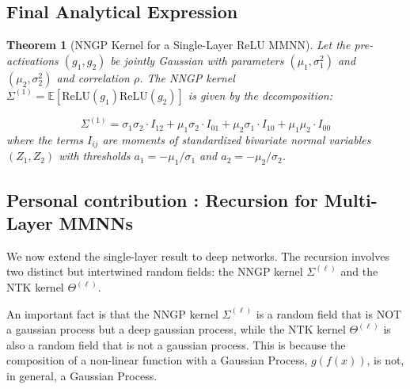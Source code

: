 \documentclass[a4paper]{article}
\theoremstyle{plain}
\newtheorem{theorem}{Theorem}[section]
\theoremstyle{definition}
\theoremstyle{remark}
\begin{document}
\subsection{Final Analytical Expression}
\begin{theorem}[NNGP Kernel for a Single-Layer ReLU MMNN]
Let the pre-activations $(g_1, g_2)$ be jointly Gaussian with parameters $(\mu_1, \sigma_1^2)$ and $(\mu_2, \sigma_2^2)$ and correlation $\rho$. The NNGP kernel $\Sigma^{(1)} = \mathbb{E}[\text{ReLU}(g_1)\text{ReLU}(g_2)]$ is given by the decomposition:

\begin{tcolorbox}[colback=blue!10,colframe=blue!80!black,title={\textbf{NNGP Kernel Decomposition}},enhanced,drop shadow,boxrule=2pt]
\begin{equation}
\label{eq:final_ntk_decomp}
\boxed{
\Sigma^{(1)} = \sigma_1\sigma_2 \cdot I_{12} + \mu_1\sigma_2 \cdot I_{01} + \mu_2\sigma_1 \cdot I_{10} + \mu_1\mu_2 \cdot I_{00}
}
\end{equation}
where the terms $I_{ij}$ are moments of standardized bivariate normal variables $(Z_1, Z_2)$ with thresholds $a_1 = -\mu_1/\sigma_1$ and $a_2 = -\mu_2/\sigma_2$.
\end{tcolorbox}
\end{theorem}















\subsection{Personal contribution : Recursion for Multi-Layer MMNNs}
We now extend the single-layer result to deep networks. The recursion involves two distinct but intertwined random fields: the NNGP kernel $\Sigma^{(\ell)}$ and the NTK kernel $\Theta^{(\ell)}$.

\begin{tcolorbox}[colback=red!10,colframe=red!80!black,title={\textbf{Crucial Remark: Random Kernels in Deep Networks}},enhanced,drop shadow,boxrule=2pt]
An important fact is that the NNGP kernel $\Sigma^{(\ell)}$ is a random field that is NOT a gaussian process but a deep gaussian process, while the NTK kernel $\Theta^{(\ell)}$ is also a random field that is not a gaussian process. This is because the composition of a non-linear function with a Gaussian Process, $g(f(x))$, is not, in general, a Gaussian Process.
\end{tcolorbox}
\end{document}
